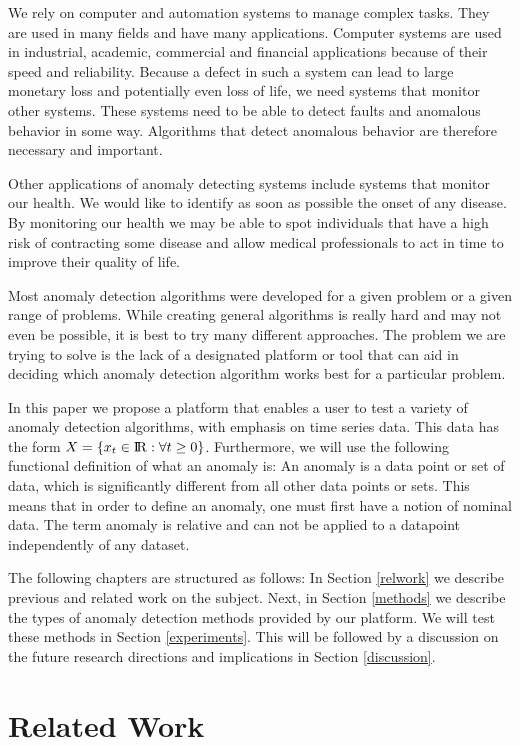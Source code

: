 \documentclass{article}
\begin{document}
We rely on computer and automation systems to manage complex tasks. They are used in many fields and have many applications. Computer systems are used in industrial, academic, commercial and financial applications because of their speed and reliability. Because a defect in such a system can lead to large monetary loss and potentially even loss of life, we need systems that monitor other systems. These systems need to be able to detect faults and anomalous behavior in some way. Algorithms that detect anomalous behavior are therefore necessary and important.

Other applications of anomaly detecting systems include systems that monitor our health. We would like to identify as soon as possible the onset of any disease. By monitoring our health we may be able to spot individuals that have a high risk of contracting some disease and allow medical professionals to act in time to improve their quality of life.

Most anomaly detection algorithms were developed for a given problem or a given range of problems. While creating general algorithms is really hard and may not even be possible, it is best to try many different approaches. The problem we are trying to solve is the lack of a designated platform or tool that can aid in deciding which anomaly detection algorithm works best for a particular problem.

In this paper we propose a platform that enables a user to test a variety of anomaly detection algorithms, with emphasis on time series data. This data has the form $X = \{x_t \in {\rm I\!R} : \forall t \ge 0\}$. Furthermore, we will use the following functional definition of what an anomaly is: An anomaly is a data point or set of data, which is significantly different from all other data points or sets. This means that in order to define an anomaly, one must first have a notion of nominal data. The term anomaly is relative and can not be applied to a datapoint independently of any dataset.

The following chapters are structured as follows: In Section \ref{relwork} we describe previous and related work on the subject. Next, in Section \ref{methods} we describe the types of anomaly detection methods provided by our platform. We will test these methods in Section \ref{experiments}. This will be followed by a discussion on the future research directions and implications in Section \ref{discussion}.

\section{Related Work \label{relwork}}
\end{document}
